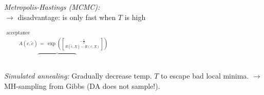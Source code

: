     \emph{Metropolis-Hastings (MCMC):}\\
    $\to$ disadvantage: is only fast when $T$ is high\\
    \begin{minipage}{\linewidth}
        \begin{minipage}{\linewidth}
            \vspace{-75pt}
            \hspace*{58pt}
            $\overbrace{
                \phantom{a\qquad\qquad\!\! a)}
            }^{
                \substack{
                    \text{acceptance}\\
                    \hspace{30pt}
                    A(c,\tilde c) \,=\, \exp(-\frac1T \brack{ R(\tilde c, X) - R(c,X)})
                }
            }$
        \end{minipage}
    \end{minipage}
\fi

\emph{Simulated annealing:}
Gradually decrease temp. $T$ to escape bad local minima.
$\to$ MH-sampling from Gibbs (DA does not sample!).

